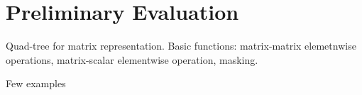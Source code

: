 \section{Preliminary Evaluation}

Quad-tree for matrix representation. Basic functions: matrix-matrix elemetnwise operations, matrix-scalar elementwise operation, masking. 

Few examples 
